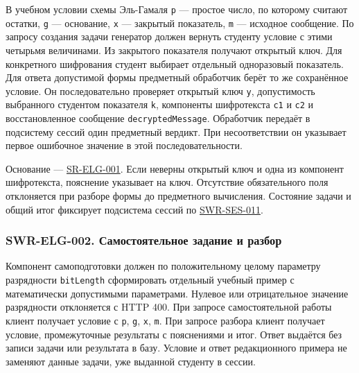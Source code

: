\documentclass[12pt,a4paper]{article}
\begin{document}
\hypertarget{swr-elg-001-условие-и-проверка-решения-эль-гамаля}{}

\hypertarget{swr-elg-001}{}

В учебном условии схемы Эль-Гамаля \texttt{p} --- простое число, по которому считают остатки, \texttt{g} --- основание, \texttt{x} --- закрытый показатель, \texttt{m} --- исходное сообщение. По запросу создания задачи генератор должен вернуть студенту условие с этими четырьмя величинами. Из закрытого показателя получают открытый ключ. Для конкретного шифрования студент выбирает отдельный одноразовый показатель. Для ответа допустимой формы предметный обработчик берёт то же сохранённое условие. Он последовательно проверяет открытый ключ \texttt{y}, допустимость выбранного студентом показателя \texttt{k}, компоненты шифротекста \texttt{c1} и \texttt{c2} и восстановленное сообщение \texttt{decrypted\allowbreak{}Message}. Обработчик передаёт в подсистему сессий один предметный вердикт. При несоответствии он указывает первое ошибочное значение в этой последовательности.

Основание --- {\href{../04\_Системные\_требования/DOC-05\_Системные\_требования.pdf\#sr-elg-001}{SR-ELG-001}}. Если неверны открытый ключ и одна из компонент шифротекста, пояснение указывает на ключ. Отсутствие обязательного поля отклоняется при разборе формы до предметного вычисления. Состояние задачи и общий итог фиксирует подсистема сессий по {\href{DOC-06.2\_Сессии\_задач\_и\_планировщик.pdf\#swr-ses-011}{SWR-SES-011}}.

\subsubsection{SWR-ELG-002. Самостоятельное задание и разбор}\label{swr-elg-002-ux441ux430ux43cux43eux441ux442ux43eux44fux442ux435ux43bux44cux43dux43eux435-ux437ux430ux434ux430ux43dux438ux435-ux438-ux440ux430ux437ux431ux43eux440}

\hypertarget{swr-elg-002-самостоятельное-задание-и-разбор}{}

\hypertarget{swr-elg-002}{}

Компонент самоподготовки должен по положительному целому параметру разрядности \texttt{bitLength} сформировать отдельный учебный пример с математически допустимыми параметрами. Нулевое или отрицательное значение разрядности отклоняется с HTTP 400. При запросе самостоятельной работы клиент получает условие с \texttt{p}, \texttt{g}, \texttt{x}, \texttt{m}. При запросе разбора клиент получает условие, промежуточные результаты с пояснениями и итог. Ответ выдаётся без записи задачи или результата в базу. Условие и ответ редакционного примера не заменяют данные задачи, уже выданной студенту в сессии.
\end{document}
